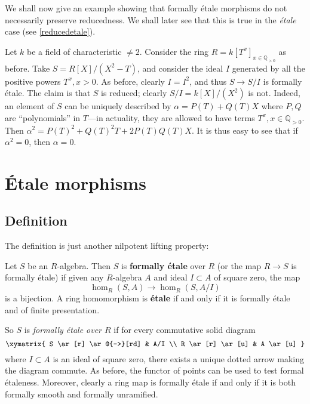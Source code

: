 \begin{example} We shall now give an example showing that formally \'etale
morphisms do not necessarily preserve reducedness. We shall later see that this
is true in the \emph{\'etale} case (see \cref{reducedetale}).

Let $k$ be a field of characteristic $\neq 2$.
Consider the ring $R = k[T^x]_{x \in \mathbb{Q}_{>0}}$ as before. 
Take $S = R[X]/(X^2 - T)$, and consider the ideal $I$ generated by all the positive
powers $T^x, x > 0$. As before, clearly $I=I^2$, and thus $S \to S/I$ is
formally \'etale.
The claim is that $S$ is reduced; clearly $S/I = k[X]/(X^2)$ is not. 
Indeed, an element of $S$ can be  uniquely described by $\alpha = P(T) + Q(T)X$ where $P, Q$ are
``polynomials'' in $T$---in actuality, they are allowed to have terms $T^x, x
\in \mathbb{Q}_{>0}$.
Then $\alpha^2 = P(T)^2 + Q(T)^2 T + 2 P(T) Q(T) X$. It is thus easy to see
that if $\alpha^2 = 0$, then $\alpha = 0$.
\end{example} 


\section{\'Etale morphisms}
\label{section-formally-etale}

\subsection{Definition}
The definition is just another nilpotent lifting property:
\begin{definition}
\label{definition-formally-etale}
Let $S$ be an $R$-algebra. Then $S$ is \textbf{formally \'etale} over $R$ (or
the map $R \to S$ is formally \'etale) if given any
$R$-algebra $A$ and ideal $I \subset A $ of square zero, the map
\[ \hom_R(S, A) \to \hom_R(S, A/I)\]
is a bijection.
A ring homomorphism is \textbf{\'etale} if and only if it is formally \'etale
and of finite presentation. 
\end{definition}

So $S$ is {\it formally \'etale over $R$} if for every
commutative solid diagram
$$
\xymatrix{
S \ar[r] \ar@{-->}[rd] & A/I \\
R \ar[r] \ar[u] & A \ar[u]
}
$$
where $I \subset A$ is an ideal of square zero, there exists
a unique dotted arrow making the diagram commute. As before, the functor
of points can be used to test formal \'etaleness.
Moreover, clearly a ring map is formally \'etale if and only if
it is both formally smooth and formally unramified.

